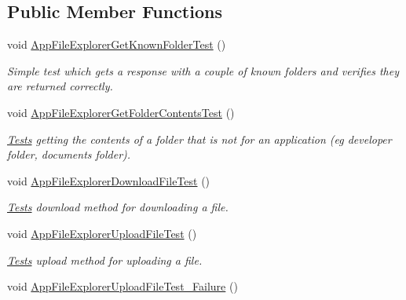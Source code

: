 \subsection*{Public Member Functions}
\begin{DoxyCompactItemize}
\item 
void \hyperlink{class_microsoft_1_1_tools_1_1_windows_device_portal_1_1_tests_1_1_app_file_explorer_tests_aed841720553d9306e9067e536c1608f1}{App\+File\+Explorer\+Get\+Known\+Folder\+Test} ()
\begin{DoxyCompactList}\small\item\em Simple test which gets a response with a couple of known folders and verifies they are returned correctly. \end{DoxyCompactList}\item 
void \hyperlink{class_microsoft_1_1_tools_1_1_windows_device_portal_1_1_tests_1_1_app_file_explorer_tests_a5a6bfdfeeb6bd8b537d7748baab8b603}{App\+File\+Explorer\+Get\+Folder\+Contents\+Test} ()
\begin{DoxyCompactList}\small\item\em \hyperlink{namespace_microsoft_1_1_tools_1_1_windows_device_portal_1_1_tests}{Tests} getting the contents of a folder that is not for an application (eg developer folder, documents folder). \end{DoxyCompactList}\item 
void \hyperlink{class_microsoft_1_1_tools_1_1_windows_device_portal_1_1_tests_1_1_app_file_explorer_tests_a3170db82509ba7d7fcdab5f6cc272ea5}{App\+File\+Explorer\+Download\+File\+Test} ()
\begin{DoxyCompactList}\small\item\em \hyperlink{namespace_microsoft_1_1_tools_1_1_windows_device_portal_1_1_tests}{Tests} download method for downloading a file. \end{DoxyCompactList}\item 
void \hyperlink{class_microsoft_1_1_tools_1_1_windows_device_portal_1_1_tests_1_1_app_file_explorer_tests_afed11700771b3c9e4af9a56e47559d28}{App\+File\+Explorer\+Upload\+File\+Test} ()
\begin{DoxyCompactList}\small\item\em \hyperlink{namespace_microsoft_1_1_tools_1_1_windows_device_portal_1_1_tests}{Tests} upload method for uploading a file. \end{DoxyCompactList}\item 
void \hyperlink{class_microsoft_1_1_tools_1_1_windows_device_portal_1_1_tests_1_1_app_file_explorer_tests_aac05ae248cbd8a4021a1e0563a63968b}{App\+File\+Explorer\+Upload\+File\+Test\+\_\+\+Failure} ()

\end{DoxyCompactItemize}
